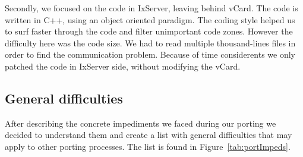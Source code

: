 Secondly, we focused on the code in IxServer, leaving behind vCard. The code is
written in C++, using an object oriented paradigm. The coding style helped us
to surf faster through the code and filter unimportant code zones. However the
difficulty here was the code size. We had to read multiple thousand-lines files
in order to find the communication problem. Because of time considerents we
only patched the code in IxServer side, without modifying the vCard.

\subsection{General difficulties}

After describing the concrete impediments we faced during our porting we decided
to understand them and create a list with general difficulties that may apply
to other porting processes. The list is found in Figure~\ref{tab:portImpeds}.

